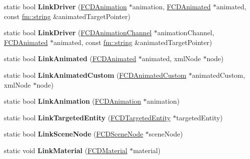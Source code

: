 \begin{DoxyCompactItemize}
\item 
\hypertarget{classFArchiveXML_a34091349172f576a2f02e3886dfc2595}{
static bool {\bfseries LinkDriver} (\hyperlink{classFCDAnimation}{FCDAnimation} $\ast$animation, \hyperlink{classFCDAnimated}{FCDAnimated} $\ast$animated, const \hyperlink{classfm_1_1stringT}{fm::string} \&animatedTargetPointer)}
\label{classFArchiveXML_a34091349172f576a2f02e3886dfc2595}

\item 
\hypertarget{classFArchiveXML_ad52e6057fd19967cd5209e8987068821}{
static bool {\bfseries LinkDriver} (\hyperlink{classFCDAnimationChannel}{FCDAnimationChannel} $\ast$animationChannel, \hyperlink{classFCDAnimated}{FCDAnimated} $\ast$animated, const \hyperlink{classfm_1_1stringT}{fm::string} \&animatedTargetPointer)}
\label{classFArchiveXML_ad52e6057fd19967cd5209e8987068821}

\item 
\hypertarget{classFArchiveXML_a0a7fe3e9e54cae1dd319d601410b40e1}{
static bool {\bfseries LinkAnimated} (\hyperlink{classFCDAnimated}{FCDAnimated} $\ast$animated, xmlNode $\ast$node)}
\label{classFArchiveXML_a0a7fe3e9e54cae1dd319d601410b40e1}

\item 
\hypertarget{classFArchiveXML_ae1b317ec797fa78504c1ec618dece108}{
static bool {\bfseries LinkAnimatedCustom} (\hyperlink{classFCDAnimatedCustom}{FCDAnimatedCustom} $\ast$animatedCustom, xmlNode $\ast$node)}
\label{classFArchiveXML_ae1b317ec797fa78504c1ec618dece108}

\item 
\hypertarget{classFArchiveXML_aa2283f0807dc7bd86d357678ea9f9fb4}{
static bool {\bfseries LinkAnimation} (\hyperlink{classFCDAnimation}{FCDAnimation} $\ast$animation)}
\label{classFArchiveXML_aa2283f0807dc7bd86d357678ea9f9fb4}

\item 
\hypertarget{classFArchiveXML_a2049189584d0b1efb47b793b16358b09}{
static bool {\bfseries LinkTargetedEntity} (\hyperlink{classFCDTargetedEntity}{FCDTargetedEntity} $\ast$targetedEntity)}
\label{classFArchiveXML_a2049189584d0b1efb47b793b16358b09}

\item 
\hypertarget{classFArchiveXML_a2a18b5e37b81d8912ae6b9910e953538}{
static bool {\bfseries LinkSceneNode} (\hyperlink{classFCDSceneNode}{FCDSceneNode} $\ast$sceneNode)}
\label{classFArchiveXML_a2a18b5e37b81d8912ae6b9910e953538}

\item 
\hypertarget{classFArchiveXML_ad5a50dfd0cad6b09a6eb087554b1bb34}{
static void {\bfseries LinkMaterial} (\hyperlink{classFCDMaterial}{FCDMaterial} $\ast$material)}
\label{classFArchiveXML_ad5a50dfd0cad6b09a6eb087554b1bb34}


\end{DoxyCompactItemize}
